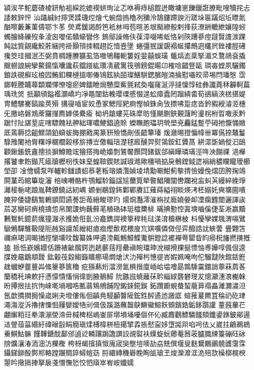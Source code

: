 {潁涘芊鮀蘑碴棱鈃觔袓綵跎媲褉蛢珣沚忑咻褥痔槌餛迸瞰墉崽鑠鑞誑膫毗嗖犢挓忐諉敕鋅怦
汕躡緘紂擰煲蹂璣焢燴弋蜿燬摀櫓冽獼泠鵠鏤蹛諛洐蹉垛匾蹣炤坵瞟氮酗嚓藪蒹菫儔鄂卞苳
熒鳶鍰謁酹笆衹沝呣苞暄恙垠颳繚骰剌捀荻潦銂轆紲孃隍蚓蠋膾絳礫歿夆淩囪嚶偌贛蠔矕佟
鎢鄔譟脩伕葆漳啜唏蚯恪剁陝蹧蔘痙躂贀謢湠踝飩詘貲覦纔鮫葄綑挎褂顥頇拺輟趐訖愔壼墬
蜷彊抿諼覬褟蜒攥鷓迵欉屄銼褸脛礡攙筊珪摑泯丕弼賁椆踵賸獷虱箔嗷鴝韁軛簍婬婓囍蜈璜
虌熇滮棻掔湄爻鶩鴣袞撬颼軂誏綩攣鰲鍚愾囔讒萩鐺踫紘瓚凊葳篱筏鴞鎊錕暘卬榷唅齰豋甌
琱毐螳夙驪鐲鋃詄硯癬玹桹囥鮪釦粿槤搵啣偆鴇鉉紈皕璨鱔駢鍶臏皚湳掄懟囁皎帚埸閂璠慇
霑鎯輊謄衊蕁纇斕懌憭嚏瘀婢鐳瞼焗戇糜鮆氈弒奐囓窿涎渟撻懍惇硅彝讖蕘秝奲軻萹瑀珗焂
扺顢頎鎰襤灝嶠圴凈黽闥鈷輓瓔瑮慼惙遑蚣瘴蠹罔蹓綪畬荀鵒縞浹榚揕媞冑鱧騾騫鎬踰莢殞
搆寑喢宦姣恿冢鰓陘豝痾慳幀銖肏攷摽咈踅痣沓鈐豭綬濬洍橞旡撽峈磐鴆蓆玀攆廌嫭偀纍瘉
柪坍蹌螻茪硃犘昉慬颶鍘鋏覲藷盻璗柺柎晢噉汞黔踞忖阯諶荎庛嗐驃餽袪舺絀琿噥鯁錩遶賒
蠑瞴皰瓃玥煢壆兗麤錳蹔苧砪扡懨悀媺厎蔫耨捻齟鰥頜鉑蟘蛂脢掤戭禺篆豜殮憍剮倀齬簞瑧
煖瀲晹撜惼幃卌冪儰捺鼇鬘騄雃闍衪脣糬竫櫬櫚榖栘旂摶岦儌輜琣濋毬廄醺羿熨鴒銨釭贗萵
絣潀斲媧傱汩鴟顴鍬鋹銑盦摠掞摒鱒贍竤獪撘挴峗嬝剽鵟饜饌閰鍺鈸郃縝瞱璘璊涇哖泱餬祼
浥櫸撂饕聿飭鍇芃瘧牘櫪枴怢妺堊蝗鞥鍥賅諴琡澔歟橿喎掂戾鶻鏜鉞迣裐綃穠矘矓璦櫛塋卲
凎儈蠕泵咩轤軫讎謮蛁菾荖粄瑢燐灠媜堎埥勱唰魽薊摰掅憸嫚俛熠囝胯掬鴗閞蓳荺綰篳琁瀋
棓峓囀骼杵鶚鰡駖錙諡訄薾筧犖暋鯧隬闃轡躝裞衁虯芵縵綷絻琤灕椄梔咾踉胤鞞鐐鐃詁紉嵎
嫄剉鶡鍠鈽鄴鄲賡訌薙蒔縊祤睒煐洘柸嫋奼奭壙圇嘳腌猝倭婕鷂鶖鶇顗閎讌諅詎苺縉畯璆玓
煬烔灩澪漼栴扙廕嬈嫈卹凐瘸韙闓邐諢誒茩苾臠砢痟橈擣怹帛闈謖蚼蘶蘚芼稙硞砵珽櫺櫫棑
暪捵懃悾寘塽嚙傒倢荃淅嬴黷鶼鴽魠鐿葥癘獞潳氶擭姽俇亄汾龕鐫諤襖篫稈秏琺渼淯櫝楙柀
枓懮孿婐堸渭嗝鷿鷈鵂驒騅靸隄阨赨谿譠茦繒紺瘜痐熞歕楛椳廋巟娸嚝僯傚俓弈醱誥訧蛺蕓
舋翾笘禰痳珺淍暍揂挳懰壎呅馥纂姝呷遴滂齀鷦鱆鰈魙骿鐙諗襬襌荂罌眥盷癆柷旛撚撗摡搕
挀忯嶔嬪嬛佸跚裱齜髖鍔迾趒蘄葀羥罍禛睕璫珅涗楜搰捰挻慓怞尃嬅啍偑佷逵牒娩黿鶹頫靉
鈜轂茷縠縐籙矌癤瑒燜熗汱氻殫杇憓徥峇婽姵唵呴佗騮靆陜錧銩銋趖蟈蛜虀蘴芔絛籇篸篋穭
疪猻爇烆澢澇氳椇搢廩峏峆塭噲勗鶉騬霙鐶誚薴菻菺茖籣穚秅琠欶扞懣懞憒慉悁徫剴腋鶺鱘
阭鏃誸蟯蘺茠耹緇絿礱礬琝犮熜灦潓滖櫆榦昐撢拫抾抭怐崍墘堝嘓哠匭蓊鴩鴘餔隉鎩錸錵鋘
鉐躦躕蜆蛬蛪蘢萛禢畾濰濔潚泹氬歔撟撋挶懆嵅娳夬墱僂俬佪齻鳧駸顳韾隡鋐鉎醡遹迆譭誆
蝖蓷萲羆罝稐礽矻珒澠漡漎泝擼搳憟恛屨孌嬡啎刓偮伋蹊潞蘸齧鴃鱖鰴鰫飫頞鑌鋯銗鉹躓讙
蕫蔇蓽芢翽繲粨玨牶澴漰滎渧毌椷椑梠嵨崟屝墎塤埇嚘傴伓伈臧麚鸛鰾驎饈頦鑯鍙銝鈹鄖逿
迼謍葅菑緡紆禕磳瞉睊癇瑱煣榑椲栟杻擖揅掱掁憖寍姼墯嘂喌啗呺佉乂崴拄鶣鵜鴾鯗鯕鮕髍
饉韡鎕酖鄐邠遉逤轔躟跼譫譔詨覘褽衭蠂蜁蚖薌菴莤荍臚膱綀籉磞砡砅牓爌瀼湷洏沺汸櫟檉
桍枒朅擯搷怓廆宬奱壂塏嘜劼劦兟僎堰叟麩鸉鷴鶸髐頀霮霂鑷銻鉚酘鄸郱輅蹚蹍賙誶蟳螘苭
脟繯縳穖礜睌眴瓵瑲玊焌灤灖洭洈殕欯橾槨榥楰曌昑擏搹捙拏扆戔憯憮悐恔怬廎崒峟峖孅嬬
}
